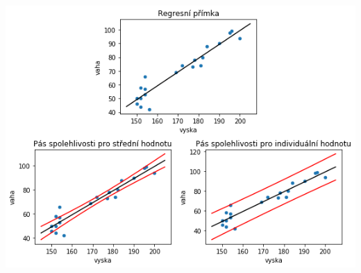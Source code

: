 \documentclass[11pt,titlepage]{article}
\begin{document}
\begin{center}
\includegraphics[width=.9\linewidth]{./obipy-resources/uPYyXq.png}
\end{center}
\end{document}
